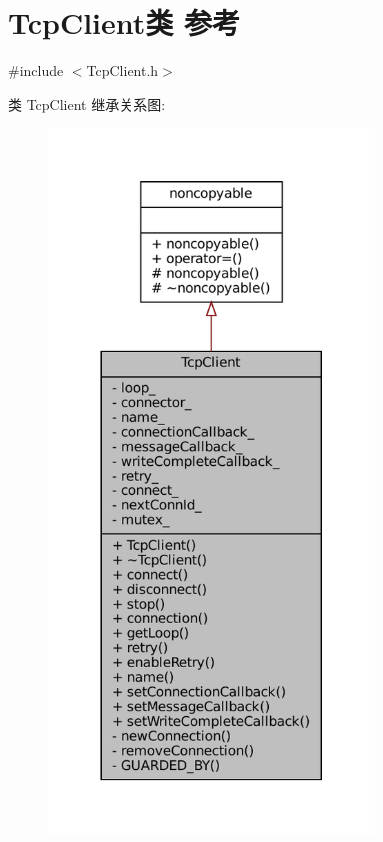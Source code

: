 \hypertarget{classmuduo_1_1net_1_1TcpClient}{}\section{Tcp\+Client类 参考}
\label{classmuduo_1_1net_1_1TcpClient}


{\ttfamily \#include $<$Tcp\+Client.\+h$>$}



类 Tcp\+Client 继承关系图\+:
\nopagebreak
\begin{figure}[H]
\begin{center}
\leavevmode
\includegraphics[width=245pt]{classmuduo_1_1net_1_1TcpClient__inherit__graph}
\end{center}
\end{figure}


